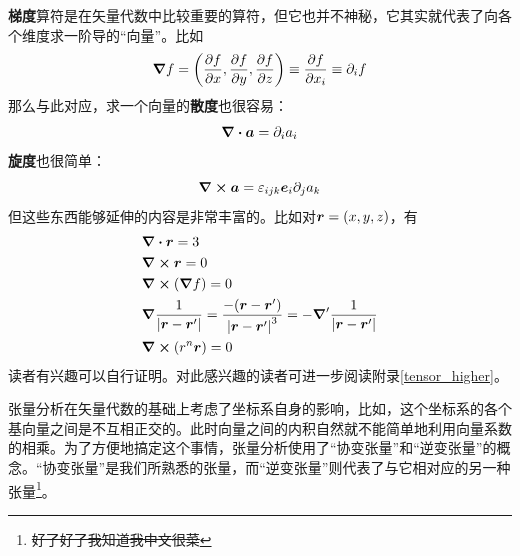 \documentclass[12pt,a4paper,openany,twoside]{book}
\numberwithin{equation}{section}
\begin{document}
          \textbf{梯度}算符是在矢量代数中比较重要的算符，但它也并不神秘，它其实就代表了向各个维度求一阶导的“向量”。比如
          \begin{equation*}
            \grad{f}=\qty(\pdv{f}{x},\pdv{f}{y},\pdv{f}{z})\equiv\pdv{f}{x_i}\equiv\partial_i f
          \end{equation*} 
          那么与此对应，求一个向量的\textbf{散度}也很容易：
          \begin{equation*}
            \div{\vb*{a}} = \partial_i a_i 
          \end{equation*} 
          \textbf{旋度}也很简单：
          \begin{equation*}
            \curl{\vb*{a}} = \varepsilon_{ijk} \vb*{e}_i \partial_j a_k
          \end{equation*} 
          但这些东西能够延伸的内容是非常丰富的。比如对$\vb*{r} = (x,y,z)$，有
          \begin{align}
            &\div{\vb*{r}} = 3 \\
            &\curl{\vb*{r}} = 0 \\
            &\curl{(\grad{f})} = 0 \\
            &\grad{\frac{1}{\abs{\vb*{r}-\vb*{r}'}}} = \frac{-\qty(\vb*{r}-\vb*{r}')}{\abs{\vb*{r}-\vb*{r}'}^3} = - \grad'{\frac{1}{\abs{\vb*{r}-\vb*{r}'}}} \\
            &\curl{\qty(r^n \vb*{r})} = 0 
          \end{align}
          读者有兴趣可以自行证明。对此感兴趣的读者可进一步阅读附录\ref{tensor_higher}。\\

          {}

          张量分析在矢量代数的基础上考虑了坐标系自身的影响，比如，这个坐标系的各个基向量之间是不互相正交的。此时向量之间的内积自然就不能简单地利用向量系数的相乘。为了方便地搞定这个事情，张量分析使用了“协变张量”和“逆变张量”的概念。“协变张量”是我们所熟悉的张量，而“逆变张量”则代表了与它相对应的另一种张量\footnote{\sout{好了好了我知道我中文很菜}}。
\end{document}
